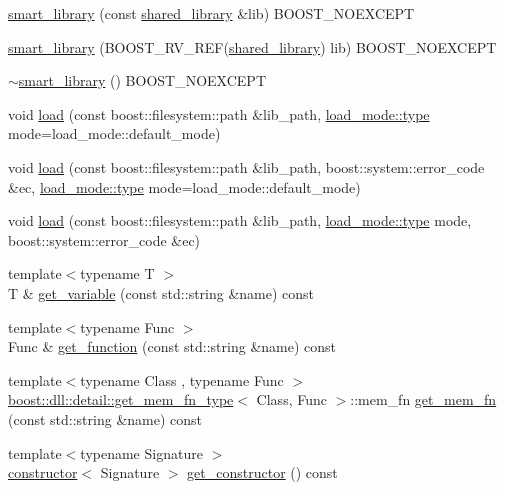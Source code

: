 \begin{DoxyCompactItemize}
\item 
\hyperlink{a01712_a5d3a9bc4a90fd70313ed193ec090d5f0}{smart\+\_\+library} (const \hyperlink{a01708}{shared\+\_\+library} \&lib) B\+O\+O\+S\+T\+\_\+\+N\+O\+E\+X\+C\+E\+PT
\item 
\hyperlink{a01712_a87ba6326545541fe3c016488ec168e82}{smart\+\_\+library} (B\+O\+O\+S\+T\+\_\+\+R\+V\+\_\+\+R\+EF(\hyperlink{a01708}{shared\+\_\+library}) lib) B\+O\+O\+S\+T\+\_\+\+N\+O\+E\+X\+C\+E\+PT
\item 
\hyperlink{a01712_ae832b6930c08e751321df14ad7a9a190}{$\sim$smart\+\_\+library} () B\+O\+O\+S\+T\+\_\+\+N\+O\+E\+X\+C\+E\+PT
\item 
void \hyperlink{a01712_af80edac534fd278f4f162ac3abadfc2b}{load} (const boost\+::filesystem\+::path \&lib\+\_\+path, \hyperlink{a00272_a1918a602801479bc0bade54ff5665129}{load\+\_\+mode\+::type} mode=load\+\_\+mode\+::default\+\_\+mode)
\item 
void \hyperlink{a01712_a0743160736368974a420326665b3dc84}{load} (const boost\+::filesystem\+::path \&lib\+\_\+path, boost\+::system\+::error\+\_\+code \&ec, \hyperlink{a00272_a1918a602801479bc0bade54ff5665129}{load\+\_\+mode\+::type} mode=load\+\_\+mode\+::default\+\_\+mode)
\item 
void \hyperlink{a01712_a08af5d7544f4fa43985254c3924df3bd}{load} (const boost\+::filesystem\+::path \&lib\+\_\+path, \hyperlink{a00272_a1918a602801479bc0bade54ff5665129}{load\+\_\+mode\+::type} mode, boost\+::system\+::error\+\_\+code \&ec)
\item 
{\footnotesize template$<$typename T $>$ }\\T \& \hyperlink{a01712_a1dff6c89b818955195b7e40bbdf33478}{get\+\_\+variable} (const std\+::string \&name) const
\item 
{\footnotesize template$<$typename Func $>$ }\\Func \& \hyperlink{a01712_aef5f4ef013d80744b97fd2cceee7b080}{get\+\_\+function} (const std\+::string \&name) const
\item 
{\footnotesize template$<$typename Class , typename Func $>$ }\\\hyperlink{a01412}{boost\+::dll\+::detail\+::get\+\_\+mem\+\_\+fn\+\_\+type}$<$ Class, Func $>$\+::mem\+\_\+fn \hyperlink{a01712_a6f8cde3afe39c1d3107d9ff63c8394b7}{get\+\_\+mem\+\_\+fn} (const std\+::string \&name) const
\item 
{\footnotesize template$<$typename Signature $>$ }\\\hyperlink{a01352}{constructor}$<$ Signature $>$ \hyperlink{a01712_a0b2f9a2756ffad487537c03a07ee533a}{get\+\_\+constructor} () const

\end{DoxyCompactItemize}
